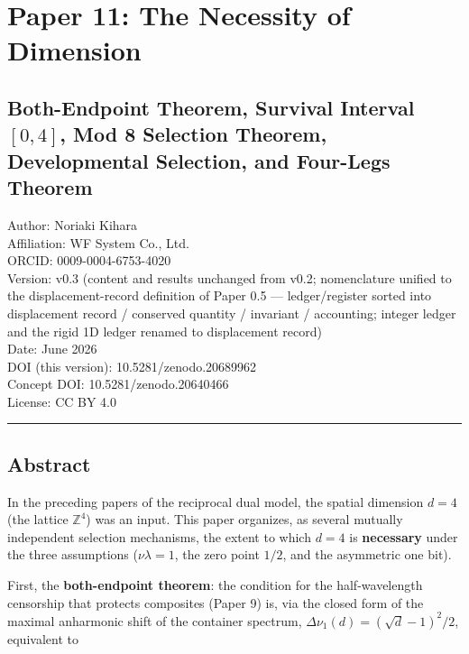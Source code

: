 \documentclass[
]{ltjsarticle}
\author{}
\date{}
\begin{document}
\section{Paper 11: The Necessity of
Dimension}\label{paper-11-the-necessity-of-dimension}

\subsection{\texorpdfstring{Both-Endpoint Theorem, Survival Interval
\([0,4]\), Mod 8 Selection Theorem, Developmental Selection, and
Four-Legs
Theorem}{Both-Endpoint Theorem, Survival Interval {[}0,4{]}, Mod 8 Selection Theorem, Developmental Selection, and Four-Legs Theorem}}\label{both-endpoint-theorem-survival-interval-04-mod-8-selection-theorem-developmental-selection-and-four-legs-theorem}

Author: Noriaki Kihara\\
Affiliation: WF System Co., Ltd.\\
ORCID: 0009-0004-6753-4020\\
Version: v0.3 (content and results unchanged from v0.2; nomenclature
unified to the displacement-record definition of Paper 0.5 ---
ledger/register sorted into displacement record / conserved quantity /
invariant / accounting; integer ledger and the rigid 1D ledger renamed
to displacement record)\\
Date: June 2026\\
DOI (this version): 10.5281/zenodo.20689962\\
Concept DOI: 10.5281/zenodo.20640466\\
License: CC BY 4.0

\begin{center}\rule{0.5\linewidth}{0.5pt}\end{center}

\subsection{Abstract}\label{abstract}

In the preceding papers of the reciprocal dual model, the spatial
dimension \(d=4\) (the lattice \(\mathbb{Z}^4\)) was an input. This
paper organizes, as several mutually independent selection mechanisms,
the extent to which \(d=4\) is \textbf{necessary} under the three
assumptions (\(\nu\lambda=1\), the zero point \(1/2\), and the
asymmetric one bit).

First, the \textbf{both-endpoint theorem}: the condition for the
half-wavelength censorship that protects composites (Paper 9) is, via
the closed form of the maximal anharmonic shift of the container
spectrum, \(\Delta\nu_1(d)=(\sqrt d-1)^2/2\), equivalent to
\end{document}
